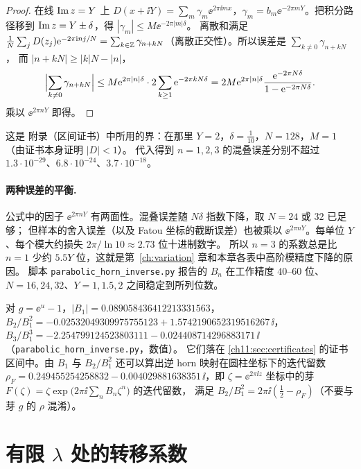 \begin{proof}
在线 $\operatorname{Im} z=Y$ 上 $D(x+\ii Y)=\sum_m\gamma_m\ee^{2\pi\ii mx}$，$\gamma_m=b_m\ee^{-2\pi mY}$。把积分路径移到 $\operatorname{Im} z=Y\pm\delta$，得 $|\gamma_m|\le M\ee^{-2\pi|m|\delta}$。
离散和满足 $\frac1N\sum_jD(z_j)\mathrm{e}^{-2\pi\mathrm{i} nj/N}=\sum_{k\in\mathbb{Z}}\gamma_{n+kN}$（离散正交性）。所以误差是 $\sum_{k\ne0}\gamma_{n+kN}$，
而 $|n+kN|\ge|k|N-|n|$，
\[
 \Bigl|\sum_{k\ne0}\gamma_{n+kN}\Bigr|\le M\mathrm{e}^{2\pi|n|\delta}\cdot2\sum_{k\ge1}\mathrm{e}^{-2\pi kN\delta}=2M\mathrm{e}^{2\pi|n|\delta}\frac{\mathrm{e}^{-2\pi N\delta}}{1-\mathrm{e}^{-2\pi N\delta}} .
\]
乘以 $\ee^{2\pi nY}$ 即得。
\end{proof}

这是 \cite{KneserPaper} 附录（区间证书）中所用的界：在那里 $Y=2$，$\delta=\tfrac1{10}$，$N=128$，$M=1$（由证书本身证明 $|D|<1$）。
代入得到 $n=1,2,3$ 的混叠误差分别不超过 $1.3\cdot10^{-29}$、$6.8\cdot10^{-24}$、$3.7\cdot10^{-18}$。

\paragraph{两种误差的平衡.} 公式中的因子 $\ee^{2\pi nY}$ 有两面性。混叠误差随 $N\delta$ 指数下降，取 $N=24$ 或 $32$ 已足够；
但样本的舍入误差（以及 Fatou 坐标的截断误差）也被乘以 $\ee^{2\pi nY}$。每单位 $Y$、每个模大约损失 $2\pi/\ln10\approx2.73$ 位十进制数字。
所以 $n=3$ 的系数总是比 $n=1$ 少约 $5.5Y$ 位，这就是第~\ref{ch:variation} 章和本章各表中高阶模精度下降的原因。
脚本 \texttt{parabolic\_\allowbreak{}horn\_\allowbreak{}inverse.py} 报告的 $B_n$ 在工作精度 $40$--$60$ 位、$N=16,24,32$、$Y=1,1.5,2$ 之间稳定到所列位数\cite{KneserPaper}。

\begin{example}\label{ch11:ex:horn}
对 $g=\ee^u-1$，$|B_1|=0.089058436412213331563$，$B_2/B_1^2=-0.02532049309975755123+1.5742190652319516267\,\ii$，
$B_3/B_1^3=-2.254799124523803111-0.024408714296883171\,\ii$（\texttt{parabolic\_\allowbreak{}horn\_\allowbreak{}inverse.py}，数值）。
它们落在 \cref{ch11:sec:certificates} 的证书区间中。由 $B_1$ 与 $B_2/B_1^2$ 还可以算出逆 horn 映射在圆柱坐标下的迭代留数
$\rho_F=0.249455254258832-0.004029881638351\,\ii$\cite{KneserPaper}，即 $\zeta=\ee^{2\pi\ii z}$ 坐标中的芽 $F(\zeta)=\zeta\exp\bigl(2\pi\ii\sum_nB_n\zeta^n\bigr)$ 的迭代留数，
满足 $B_2/B_1^2=2\pi\ii(\tfrac12-\rho_F)$（不要与芽 $g$ 的 $\rho$ 混淆）。
\end{example}

\section{有限 \texorpdfstring{$\lambda$}{lambda} 处的转移系数}\label{ch11:sec:transition}

